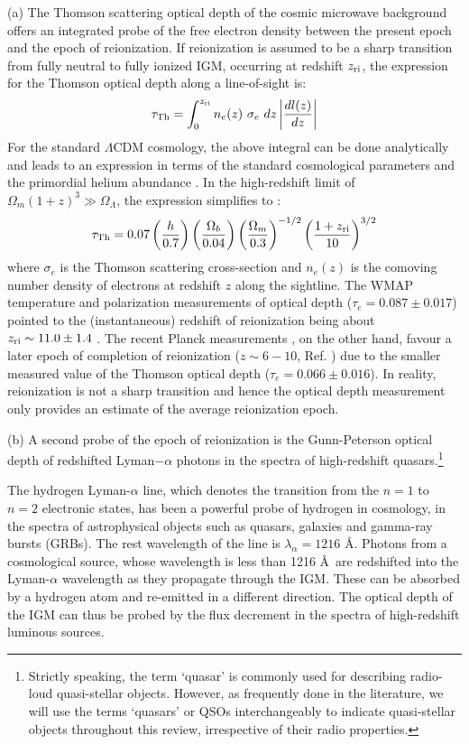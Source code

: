 (a) The Thomson scattering optical depth of the cosmic microwave background offers an integrated probe of the free electron density between the present epoch and the epoch of reionization. If reionization is assumed to be a sharp transition from fully neutral to fully ionized IGM, occurring at redshift $z_{\rm ri}$, the expression for the Thomson optical depth along a line-of-sight is:
\begin{equation}
 \tau_{\rm Th} = \int_0^{z_{\rm ri}} n_e(z) \ \sigma_e \  dz \left|\frac{dl(z)}{dz}\right|
\end{equation} 
For the standard $\Lambda$CDM cosmology, the above integral can be done analytically and leads to an expression in terms of the standard cosmological parameters and the primordial helium abundance \cite{venkatesan2008}. In the high-redshift limit of $\Omega_m (1+z)^3 \gg \Omega_{\Lambda}$, the expression simplifies to \cite{moandwhite}:
\begin{equation}
 \tau_{\rm Th} = 0.07 \left(\frac{h}{0.7}\right) \left(\frac{\Omega_{b}}{0.04}\right) \left(\frac{\Omega_{m}}{0.3}\right)^{-1/2} \left(\frac{1 + z_{\rm ri}}{10}\right)^{3/2}
\end{equation} 
where $\sigma_e$ is the Thomson scattering cross-section and $n_e(z)$ is the comoving number density of electrons at redshift $z$ along the sightline. 
 The WMAP temperature and polarization measurements of optical depth ($\tau_e = 0.087 \pm 0.017$) pointed to the (instantaneous) redshift of reionization being about $z_{\rm ri} \sim 11.0 \pm 1.4$ \cite{dunkley2009}.  The recent Planck measurements \cite{planck2015}, on the other hand, favour a later epoch of completion of reionization ($z \sim 6-10$, Ref. \cite{mitra2019, robertson2015}) due to the smaller measured value of the Thomson optical depth ($\tau_e = 0.066 \pm  0.016$). In reality, reionization is not a sharp transition and hence the optical depth measurement only provides an estimate of the average reionization epoch.
 
(b) A second probe of the epoch of reionization is the Gunn-Peterson optical depth of redshifted Lyman$-\alpha$ photons in the spectra of high-redshift quasars.\footnote{ {Strictly speaking, the term `quasar' is commonly used  for describing radio-loud quasi-stellar objects. However, as frequently done in the literature,  we will use the terms `quasars' or QSOs interchangeably to indicate quasi-stellar objects throughout this review, irrespective of their radio properties.}}
 
 The hydrogen Lyman-$\alpha$ line, which denotes the transition from the $n = 1$ to $n = 2$ electronic states, has been a powerful probe of hydrogen in cosmology, in the spectra of astrophysical objects such as quasars, galaxies and gamma-ray bursts (GRBs). The rest wavelength of the line is $\lambda_{\alpha} = 1216$ \AA. Photons from a cosmological source, whose wavelength is less than 1216 \AA\ are redshifted into the Lyman-$\alpha$ wavelength as they propagate through the IGM. These can be absorbed by a hydrogen atom and re-emitted in a different direction. The optical depth of the IGM can thus be probed by the flux decrement in the spectra of high-redshift luminous sources. 

